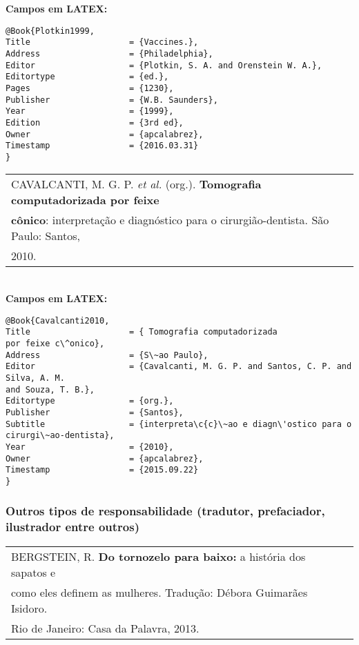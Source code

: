 \textbf{Campos em LATEX:}

\begin{verbatim}
@Book{Plotkin1999,
Title                    = {Vaccines.},
Address                  = {Philadelphia},
Editor                   = {Plotkin, S. A. and Orenstein W. A.},
Editortype               = {ed.},
Pages                    = {1230},
Publisher                = {W.B. Saunders},
Year                     = {1999},
Edition                  = {3rd ed},
Owner                    = {apcalabrez},
Timestamp                = {2016.03.31}
}
\end{verbatim}

\begin{tabular}{|l|c|} \hline
	CAVALCANTI, M. G. P. \textit{et al.} (org.). \textbf{Tomografia computadorizada por feixe} \\ \textbf{c\^onico}: interpreta\c{c}\~ao e diagn\'ostico para o cirurgi\~ao-dentista. S\~ao Paulo: Santos, \\ 2010.\\\hline
\end{tabular}\\

\textbf{Campos em LATEX:}

\begin{verbatim}
@Book{Cavalcanti2010,
Title                    = { Tomografia computadorizada 
por feixe c\^onico},
Address                  = {S\~ao Paulo},
Editor                   = {Cavalcanti, M. G. P. and Santos, C. P. and 
Silva, A. M.
and Souza, T. B.},
Editortype               = {org.},
Publisher                = {Santos},
Subtitle                 = {interpreta\c{c}\~ao e diagn\'ostico para o 
cirurgi\~ao-dentista},
Year                     = {2010},
Owner                    = {apcalabrez},
Timestamp                = {2015.09.22}
}
\end{verbatim}

\subsubsection{Outros tipos de responsabilidade (tradutor, prefaciador, ilustrador entre outros)} 


\begin{tabular}{|l|c|} \hline
	BERGSTEIN, R. \textbf{Do tornozelo para baixo:}  a hist\'oria dos
	sapatos e \\ como eles definem as mulheres. Tradu\c{c}\~ao: D\'ebora Guimar\~aes Isidoro.\\ Rio de
	Janeiro: Casa da Palavra, 2013. \\\hline
\end{tabular}\\

